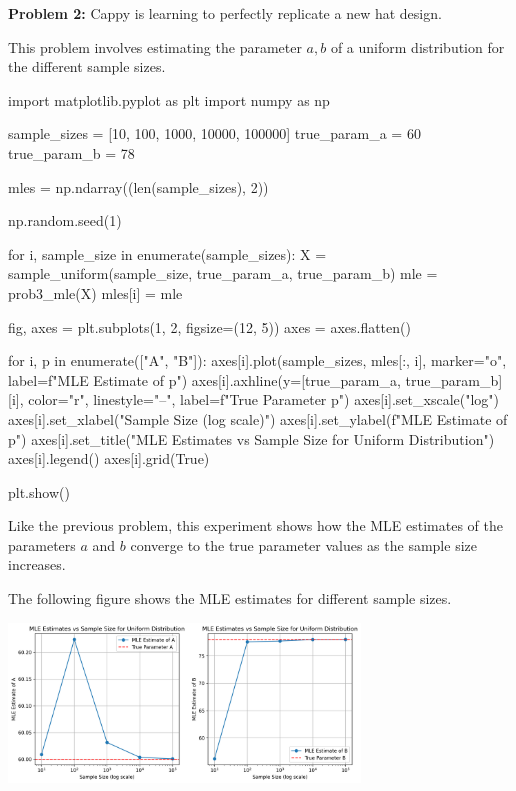 \documentclass[a4paper, 10pt]{article}
\begin{document}
\newpage

\begin{subproblems}[start=2]
    \item \textbf{Problem 2: } Cappy is learning to perfectly replicate a new hat design.
\end{subproblems}

\begin{solution}
This problem involves estimating the parameter \( a, b \) of a uniform distribution for the different sample sizes.
\begin{codingbox}
import matplotlib.pyplot as plt
import numpy as np

sample_sizes = [10, 100, 1000, 10000, 100000]
true_param_a = 60
true_param_b = 78

mles = np.ndarray((len(sample_sizes), 2))

np.random.seed(1)

for i, sample_size in enumerate(sample_sizes):
    X = sample_uniform(sample_size, true_param_a, true_param_b)
    mle = prob3_mle(X)
    mles[i] = mle

fig, axes = plt.subplots(1, 2, figsize=(12, 5))
axes = axes.flatten()

for i, p in enumerate(["A", "B"]):
    axes[i].plot(sample_sizes, mles[:, i], marker="o", label=f"MLE Estimate of {p}")
    axes[i].axhline(y=[true_param_a, true_param_b][i], color="r", linestyle="--", label=f"True Parameter {p}")
    axes[i].set_xscale("log")
    axes[i].set_xlabel("Sample Size (log scale)")
    axes[i].set_ylabel(f"MLE Estimate of {p}")
    axes[i].set_title("MLE Estimates vs Sample Size for Uniform Distribution")
    axes[i].legend()
    axes[i].grid(True)

plt.show()
\end{codingbox}

Like the previous problem, this experiment shows how the MLE estimates of the parameters \( a \) and \( b \) converge to the true parameter values as the sample size increases.

\vspace{3mm}

The following figure shows the MLE estimates for different sample sizes.
\begin{center}
    \includegraphics[width=0.7\textwidth]{images/problem_7_2.png}
\end{center}
\end{solution}
\end{document}
